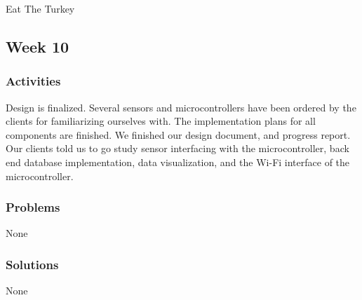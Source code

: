 \documentclass[IEEEtran,letterpaper,10pt,titlepage,fleqn,draftclsnofoot,onecolumn]{article}
\begin{document}
Eat The Turkey

\subsection{Week 10}
\subsubsection{Activities}

Design is finalized. Several sensors and microcontrollers have been ordered by the clients for familiarizing ourselves with. The implementation plans for all components are finished. We finished our design document, and progress report. Our clients told us to go study sensor interfacing with the microcontroller, back end database implementation, data visualization, and the Wi-Fi interface of the microcontroller. 

\subsubsection{Problems}

None

\subsubsection{Solutions}

None
\end{document}
